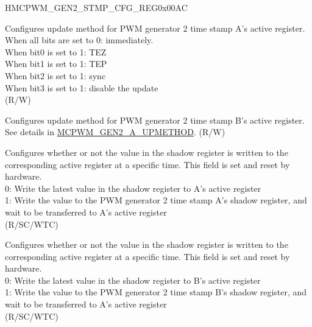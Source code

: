 \begin{register}{H}{MCPWM\_GEN2\_STMP\_CFG\_REG}{0x00AC}\label{regdesc:MCPWMGEN2STMPCFGREG}
%
%
%
%
%
\regnewline%
\begin{regdesc}\begin{reglist}
\label{fielddesc:MCPWMGEN2AUPMETHOD}\item [MCPWM\_GEN2\_A\_UPMETHOD] Configures update method for PWM generator 2 time stamp A's active register.
\\When all bits are set to 0: immediately.
\\When bit0 is set to 1: TEZ
\\When bit1 is set to 1: TEP
\\When bit2 is set to 1: sync
\\When bit3 is set to 1: disable the update
\\(R/W)
\label{fielddesc:MCPWMGEN2BUPMETHOD}\item [MCPWM\_GEN2\_B\_UPMETHOD] Configures update method for PWM generator 2 time stamp B's active register. See details in \hyperref[fielddesc:MCPWMGEN2AUPMETHOD]{MCPWM\_GEN2\_A\_UPMETHOD}. (R/W)
\label{fielddesc:MCPWMGEN2ASHDWFULL}\item [MCPWM\_GEN2\_A\_SHDW\_FULL] Configures whether or not the value in the shadow register is written to the corresponding active register at a specific time. This field is set and reset by hardware. \\
0: Write the latest value in the shadow register to A's active register \\
1: Write the value to the PWM generator 2 time stamp A's shadow register, and wait to be transferred to A's active register \\
(R/SC/WTC)
\label{fielddesc:MCPWMGEN2BSHDWFULL}\item [MCPWM\_GEN2\_B\_SHDW\_FULL] Configures whether or not the value in the shadow register is written to the corresponding active register at a specific time. This field is set and reset by hardware. \\
0: Write the latest value in the shadow register to B's active register \\
1: Write the value to the PWM generator 2 time stamp B's shadow register, and wait to be transferred to A's active register \\
(R/SC/WTC)
\end{reglist}\end{regdesc}
\end{register}


